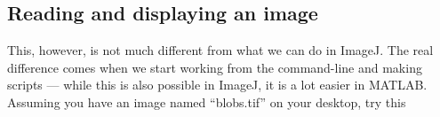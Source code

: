 \subsection{Reading and displaying  an image}
This, however, is not much different from what we can do in ImageJ.
The real difference comes when we start working from the command-line and making scripts --- while this is also possible in ImageJ, it is a lot easier in MATLAB. Assuming you have an image named ``blobs.tif'' on your desktop, try this